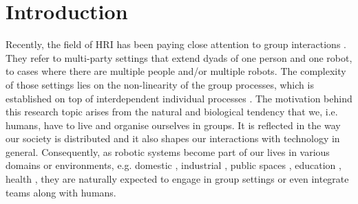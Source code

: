 
\chapter{Introduction}
\label{chapter:introduction}

Recently, the field of \gls{HRI} has been paying close attention to group interactions \cite{jung2017robots}. They refer to multi-party settings that extend dyads of one person and one robot, to cases where there are multiple people and/or multiple robots. The complexity of those settings lies on the non-linearity of the group processes, which is established on top of interdependent individual processes \cite{wildschut2007explanations}. The motivation behind this research topic arises from the natural and biological tendency that we, i.e. humans, have to live and organise ourselves in groups. It is reflected in the way our society is distributed and it also shapes our interactions with technology in general. Consequently, as robotic systems become part of our lives in various domains or environments, e.g. domestic \cite{christensen2003intelligent}, industrial \cite{guiochet2017safety}, public spaces \cite{jensen2005robots,kanda2009affective}, education \cite{belpaeme2018social}, health \cite{breazeal2011social}, they are naturally expected to engage in group settings or even integrate teams along with humans.




